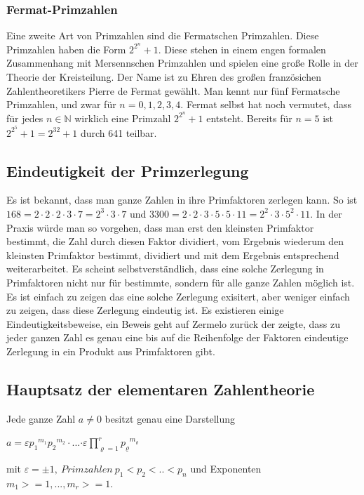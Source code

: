 \documentclass[a4paper,11pt]{article}
\begin{document}
\subsubsection*{Fermat-Primzahlen}
Eine zweite Art von Primzahlen sind die Fermatschen Primzahlen. Diese
Primzahlen haben die Form $2^{2^n} +1 $. Diese stehen in einem engen formalen
Zusammenhang mit Mersennschen Primzahlen und spielen eine große Rolle
in der Theorie der Kreisteilung. Der Name ist zu Ehren des großen
französichen Zahlentheoretikers Pierre de Fermat gewählt. Man kennt
nur fünf Fermatsche Primzahlen, und zwar für $n = 0,1,2,3,4$. Fermat
selbst hat noch vermutet, dass für jedes $n \in {\mathbb N}$ wirklich
eine Primzahl $2^{2^n} +1 $ entsteht. Bereits für $n = 5$ ist
$2^{2^5}+1 = 2^{32}+1 $ durch 641 teilbar.

\subsection{Eindeutigkeit der Primzerlegung}
Es ist bekannt, dass man ganze Zahlen in ihre Primfaktoren zerlegen kann. So ist
$168 = 2 \cdot 2 \cdot 2 \cdot 3  \cdot 7 = 2^3 \cdot 3 \cdot 7$ und
$3300 = 2\cdot2\cdot3\cdot5\cdot5\cdot11=2^2\cdot3\cdot5^2\cdot11$.
In der Praxis würde man so vorgehen, dass man erst den kleinsten Primfaktor
bestimmt, die Zahl durch diesen Faktor dividiert, vom Ergebnis wiederum den
kleinsten Primfaktor bestimmt, dividiert und mit dem Ergebnis entsprechend
weiterarbeitet. Es scheint selbstverständlich, dass eine solche Zerlegung in
Primfaktoren nicht nur für bestimmte, sondern für alle ganze Zahlen möglich
ist. Es ist einfach zu zeigen das eine solche Zerlegung exisitert, aber weniger
einfach zu zeigen, dass diese Zerlegung eindeutig ist. Es existieren einige
Eindeutigkeitsbeweise, ein Beweis geht auf Zermelo zurück der zeigte,
dass zu jeder ganzen Zahl es genau eine bis auf die
Reihenfolge der Faktoren eindeutige Zerlegung in ein Produkt aus Primfaktoren
gibt.
\subsection{Hauptsatz der elementaren Zahlentheorie}
Jede ganze Zahl $a \not= 0$ besitzt genau eine Darstellung
\begin{center}
{$a = \varepsilon {p_1}^{m_1} {p_2}^{m_2} \cdot$...$\cdot
\varepsilon\prod_{\varrho = 1}^r {p_\varrho}^{m_\varrho}$}
\end{center}
mit $\varepsilon=\pm1,\ Primzahlen\ p_1 < p_2 < .. < p_n$ und Exponenten
$m_1 >= 1, ... , m_r >= 1$.
\end{document}

